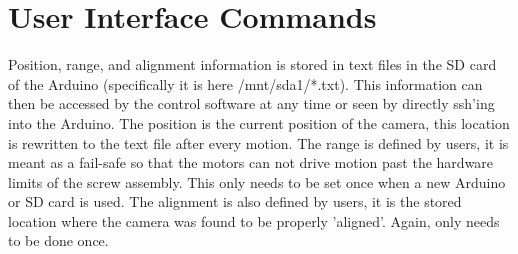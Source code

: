 \documentclass[11pt]{article}
\begin{document}
\section{User Interface Commands}
	Position, range, and alignment information is stored in text files in the SD card of the Arduino (specifically it is here  /mnt/sda1/*.txt).
	This information can then be accessed by the control software at any time or seen by directly ssh'ing into the Arduino.
	The position is the current position of the camera, this location is rewritten to the text file after every motion.
	The range is defined by users, it is meant as a fail-safe so that the motors can not drive motion past the hardware limits of the screw assembly.
	This only needs to be set once when a new Arduino or SD card is used.
	The alignment is also defined by users, it is the stored location where the camera was found to be properly 'aligned'.
	Again, only needs to be done once.
\end{document}
